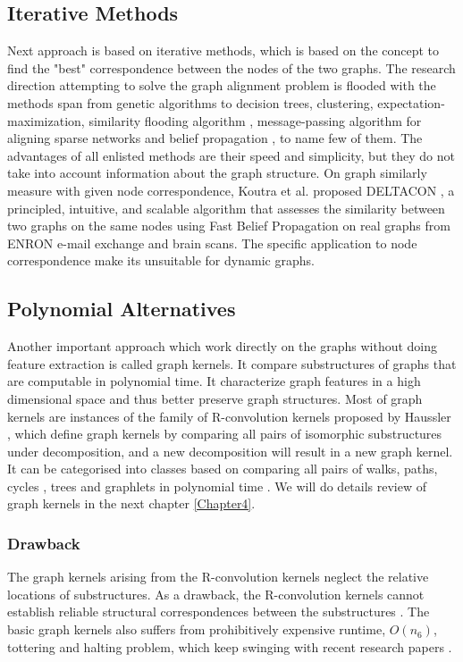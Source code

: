 \subsection{Iterative Methods}

Next approach is based on iterative methods, which is based on the concept to find the "best" correspondence between the nodes of the two graphs. The research direction attempting to solve the graph alignment problem is flooded with the methods span from genetic algorithms to decision trees, clustering, expectation-maximization, similarity flooding algorithm \citep{Melnik2002}, message-passing algorithm for aligning sparse networks and belief propagation \citep{Koutra2015}, to name few of them. The advantages of all enlisted methods are their speed and simplicity, but they do not take into account information about the graph structure. On graph similarly measure with given node correspondence, Koutra et al. \citep{Koutra2015} proposed DELTACON , a principled, intuitive, and scalable algorithm that assesses the similarity between two graphs on the same nodes using Fast Belief Propagation on real graphs from ENRON e-mail exchange and brain scans. The specific application to node correspondence make its unsuitable for dynamic graphs.

\subsection{Polynomial Alternatives}

Another important approach which work directly on the graphs without doing feature extraction is called graph kernels. It compare substructures of graphs that are computable in polynomial
time. It characterize graph features in a high dimensional space and thus better preserve graph structures. Most of graph kernels are instances of the family of R-convolution kernels proposed by  Haussler \citep{Haussler1999}, which define graph kernels by comparing all pairs of isomorphic substructures under decomposition, and a new decomposition
will result in a new graph kernel. It can be categorised into classes based on comparing all pairs of walks, paths, cycles \citep{Aziz2013}, trees and graphlets in polynomial time \citep{Vishwanathan2010}. We will do details review of graph kernels in the next chapter \ref{Chapter4}.

\subsubsection{Drawback}
The graph kernels arising from the R-convolution kernels neglect the relative locations of substructures. As a drawback, the R-convolution kernels cannot establish reliable structural correspondences between the
substructures \citep{Bai2015}. The basic graph kernels also suffers from  prohibitively expensive runtime, $O(n_{6})$, tottering and halting problem, which keep swinging with recent research papers \citep{Vishwanathan2010}. 

